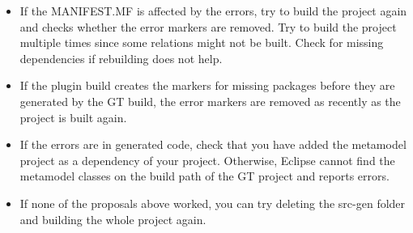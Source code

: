 \begin{itemize}

    \item If the MANIFEST.MF is affected by the errors, try to build the project again and checks whether the error markers are removed. Try to build the project multiple times since some relations might not be built. Check for missing dependencies if rebuilding does not help. 
    
    \item If the plugin build creates the markers for missing packages before they are generated by the GT build, the error markers are removed as recently as the project is built again.
    
    \item If the errors are in generated code, check that you have added the metamodel project as a dependency of your project. Otherwise, Eclipse cannot find the metamodel classes on the build path of the GT project and reports errors.
    
    \item If none of the proposals above worked, you can try deleting the src-gen folder and building the whole project again. \newline

\end{itemize}

%
%
%    
%    
%

\clearpage